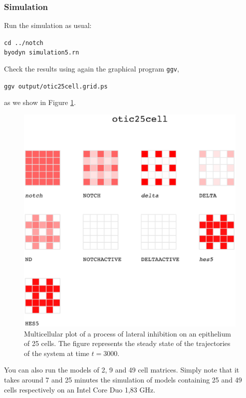 \documentclass[a4paper, 11pt]{article}
\begin{document}
  \subsubsection{Simulation}
  Run the simulation as usual:
  \begin{center}
    \texttt{cd ../notch}\\
    \texttt{byodyn simulation5.rn} 
  \end{center}
  Check the results using again the graphical program \texttt{ggv},
  \begin{center}
    \texttt{ggv output/otic25cell.grid.ps}
  \end{center}
  as we show in Figure \ref{multicellular}.
  \begin{figure}
    \begin{center}
      \includegraphics[scale=.5]{figures/multicellular.eps}
      \caption{Multicellular plot of a process of lateral inhibition on an epithelium of 25 cells.
        The figure represents the steady state of the trajectories of the system at time $t=3000$.
        \label{multicellular}}
    \end{center}
  \end{figure}
  You can also run the models of 2, 9 and 49 cell matrices.
  Simply note that it takes around 7 and 25 minutes the simulation of models containing 25 and 49 cells respectively on an Intel Core Duo 1,83 GHz.
  
  
\end{document}
